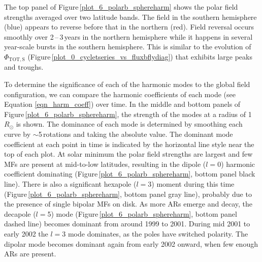 \documentclass[namedreferences]{solarphysics}
\begin{document}
\begin{article}
The top panel of Figure\,\ref{plot_6_polarb_sphereharm} shows the polar field strengths averaged over two latitude bands. The field in the southern hemisphere (blue) appears to reverse before that in the northern (red). Field reversal occurs smoothly over 2\,--\,3\,years in the northern hemisphere while it happens in several year-scale bursts in the southern hemisphere. This is similar to the evolution of $\Phi_{\mathrm{TOT,S}}$ (Figure\,\ref{plot_0_cycletseries_vs_fluxbflydiag}) that exhibits large peaks and troughs.

To determine the significance of each of the harmonic modes to the global field configuration, we can compare the harmonic coefficients of each mode (see Equation \ref{eqn_harm_coeff}) over time. In the middle and bottom panels of Figure\,\ref{plot_6_polarb_sphereharm}, the strength of the modes at a radius of 1\,$R_{\odot}$ is shown. The dominance of each mode is determined by smoothing each curve by $\sim$5\,rotations and taking the absolute value. The dominant mode coefficient at each point in time is indicated by the horizontal line style near the top of each plot. At solar minimum the polar field strengths are largest and few MFs are present at mid-to-low latitudes, resulting in the dipole ($l$$=$0) harmonic coefficient dominating (Figure\,\ref{plot_6_polarb_sphereharm}, bottom panel black line). There is also a significant hexapole ($l$$=$3) moment during this time (Figure\,\ref{plot_6_polarb_sphereharm}, bottom panel gray line), probably due to the presence of single bipolar MFs on disk. As more ARs emerge and decay, the decapole ($l$$=$5) mode (Figure\,\ref{plot_6_polarb_sphereharm}, bottom panel dashed line) becomes dominant from around 1999 to 2001. During mid 2001 to early 2002 the $l$$=$3 mode dominates, as the poles have switched polarity. The dipolar mode becomes dominant again from early 2002 onward, when few enough ARs are present.


\end{article}
\end{document}
